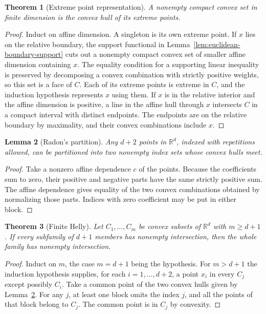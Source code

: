 \documentclass[11pt,oneside,openany]{book}
\theoremstyle{plain}
\newtheorem{theorem}{Theorem}[chapter]
\newtheorem{lemma}[theorem]{Lemma}
\theoremstyle{definition}
\theoremstyle{remark}
\begin{document}
\begin{theorem}[Extreme point representation]
\label{thm:extreme-representation}
A nonempty compact convex set in finite dimension is the convex hull
of its extreme points.
\end{theorem}

\begin{proof}
Induct on affine dimension. A singleton is its own extreme point.
If \(x\) lies on the relative boundary, the support functional in
Lemma~\ref{lem:euclidean-boundary-support} cuts out a nonempty compact
convex set of smaller affine dimension containing \(x\).
The equality condition for a supporting linear inequality is
preserved by decomposing a convex combination with strictly positive
weights, so this set is a face of \(C\). Each of its extreme points
is extreme in \(C\), and the induction hypothesis represents \(x\)
using them. If \(x\) is in the relative interior and the affine
dimension is positive, a line in the affine hull through \(x\)
intersects \(C\) in a compact interval with distinct endpoints.
The endpoints are on the relative boundary by maximality, and their
convex combinations include \(x\).
\end{proof}

\begin{lemma}[Radon's partition]\label{lem:radon-partition}
Any \(d+2\) points in \(\mathbb R^d\), indexed with repetitions
allowed, can be partitioned into two nonempty index sets whose
convex hulls meet.
\end{lemma}

\begin{proof}
Take a nonzero affine dependence \(c\) of the points. Because the
coefficients sum to zero, their positive and negative parts have the
same strictly positive sum. The affine dependence gives equality
of the two convex combinations obtained by normalizing those
parts. Indices with zero coefficient may be put in either block.
\end{proof}

\begin{theorem}[Finite Helly]\label{thm:helly}
Let \(C_1,\dots,C_m\) be convex subsets of \(\mathbb R^d\) with
\(m\ge d+1\). If every subfamily of \(d+1\) members has nonempty
intersection, then the whole family has nonempty intersection.
\end{theorem}

\begin{proof}
Induct on \(m\), the case \(m=d+1\) being the hypothesis.
For \(m>d+1\) the induction hypothesis supplies, for each
\(i=1,\dots,d+2\), a point \(x_i\) in every \(C_j\) except
possibly \(C_i\). Take a common point of the two convex hulls
given by Lemma~\ref{lem:radon-partition}. For any \(j\), at least
one block omits the index \(j\), and all the points of that block
belong to \(C_j\). The common point is in \(C_j\) by convexity.
\end{proof}
\end{document}
